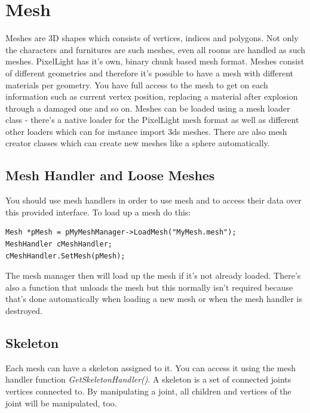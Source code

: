 \section{Mesh}
Meshes are 3D shapes which consists of vertices, indices and polygons. Not only the characters and furnitures are such meshes, even all rooms are handled as such meshes. PixelLight has it's own, binary chunk based mesh format. Meshes consist of different geometries and therefore it's possible to have a mesh with different materials per geometry. You have full access to the mesh to get on each information such as current vertex position, replacing a material after explosion through a damaged one and so on. Meshes can be loaded using a mesh loader class - there's a native loader for the PixelLight mesh format as well as different other loaders which can for instance import 3ds meshes. There are also mesh creator classes which can create new meshes like a sphere automatically.




\subsection{Mesh Handler and Loose Meshes}
You should use mesh handlers in order to use mesh and to access their data over this provided interface. To load up a mesh do this:

\begin{lstlisting}[caption=Loading a mesh]
Mesh *pMesh = pMyMeshManager->LoadMesh("MyMesh.mesh");
MeshHandler cMeshHandler;
cMeshHandler.SetMesh(pMesh);
\end{lstlisting}

The mesh manager then will load up the mesh if it's not already loaded. There's also a function that unloads the mesh but this normally isn't required because that's done automatically when loading a new mesh or when the mesh handler is destroyed.




\subsection{Skeleton}
Each mesh can have a skeleton assigned to it. You can access it using the mesh handler function \emph{GetSkeletonHandler()}. A skeleton is a set of connected joints vertices connected to. By manipulating a joint, all children and vertices of the joint will be manipulated, too.


